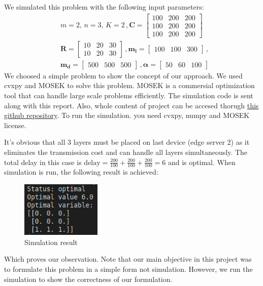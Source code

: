 \documentclass[lettersize,journal]{IEEEtran}
\begin{document}
We simulated this problem with the following input parameters:
\begin{align}
&m = 2, \, n = 3, \, K = 2 \, , \boldsymbol{C} = \begin{bmatrix}
100 & 200 & 200 \\
100 & 200 & 200 \\
100 & 200 & 200
\end{bmatrix} \\
&\boldsymbol{R} = \begin{bmatrix}
10 & 20 & 30 \\
10 & 20 & 30
\end{bmatrix} \, , \boldsymbol{m_l} = \begin{bmatrix}
100 & 100 & 300
\end{bmatrix} \, , \nonumber \\
&\boldsymbol{m_d} = \begin{bmatrix}
500 & 500 & 500
\end{bmatrix} \, , \boldsymbol{\alpha} = \begin{bmatrix}
50 & 60 & 100 \nonumber
\end{bmatrix}
\end{align}
We choosed a simple problem to show the concept of our approach. We used cvxpy and MOSEK to solve this problem. MOSEK is a commersial optimization tool that can handle large scale problems efficiently. The simulation code is sent along with this report. Also, whole content of project can be accesed thorugh \href{https://github.com/NimaSamadi007/cvxopt2-project}{this github repository}. To run the simulation. you need cvxpy, numpy and MOSEK license. 

It's obvious that all 3 layers must be placed on last device (edge server 2) as it eliminates the transmission cost and can handle all layers simultaneously. The total delay in this case is $\mathrm{delay} = \frac{200}{100}+\frac{200}{100}+\frac{200}{100}=6$ and is optimal. When simulation is run, the following result is achieved:
\begin{figure}[H]
\centering
\includegraphics[width=1.5in]{assets/opt-res.png}
\caption{Simulation result}
\end{figure}
Which proves our observation. Note that our main objective in this project was to formulate this problem in a simple form not simulation. However, we run the simulation to show the correctness of our formulation. 
\end{document}
